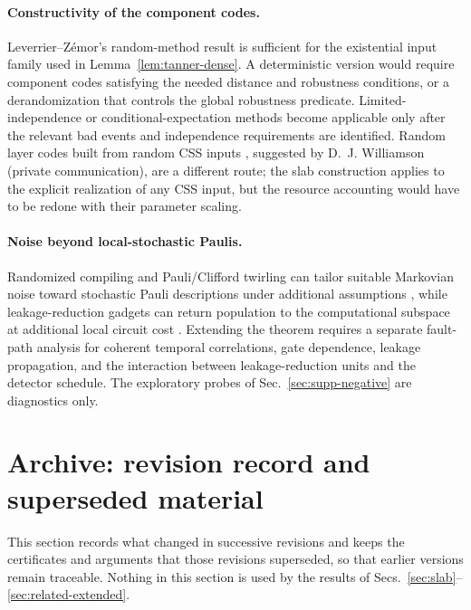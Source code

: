 \documentclass[aps,prx,reprint,superscriptaddress,nofootinbib,floatfix,longbibliography]{revtex4-2}
\theoremstyle{definition}
\begin{document}
\paragraph{Constructivity of the component codes.}
Leverrier--Z\'emor's random-method result is sufficient for the existential input family used in Lemma~\ref{lem:tanner-dense}.  A deterministic version would require component codes satisfying the needed distance and robustness conditions, or a derandomization that controls the global robustness predicate.  Limited-independence or conditional-expectation methods become applicable only after the relevant bad events and independence requirements are identified.  Random layer codes built from random CSS inputs \cite{GuRandomLayerCodes2026}, suggested by D.~J. Williamson (private communication), are a different route; the slab construction applies to the explicit realization of any CSS input, but the resource accounting would have to be redone with their parameter scaling.

\paragraph{Noise beyond local-stochastic Paulis.}
Randomized compiling and Pauli/Clifford twirling can tailor suitable Markovian noise toward stochastic Pauli descriptions under additional assumptions \cite{WallmanEmerson,BealeTwirl}, while leakage-reduction gadgets can return population to the computational subspace at additional local circuit cost \cite{SucharaLeakage}.  Extending the theorem requires a separate fault-path analysis for coherent temporal correlations, gate dependence, leakage propagation, and the interaction between leakage-reduction units and the detector schedule.  The exploratory probes of Sec.~\ref{sec:supp-negative} are diagnostics only.


\section{Archive: revision record and superseded material}
\label{sec:archive}
This section records what changed in successive revisions and keeps the
certificates and arguments that those revisions superseded, so that earlier
versions remain traceable.  Nothing in this section is used by the results
of Secs.~\ref{sec:slab}--\ref{sec:related-extended}.
\end{document}

